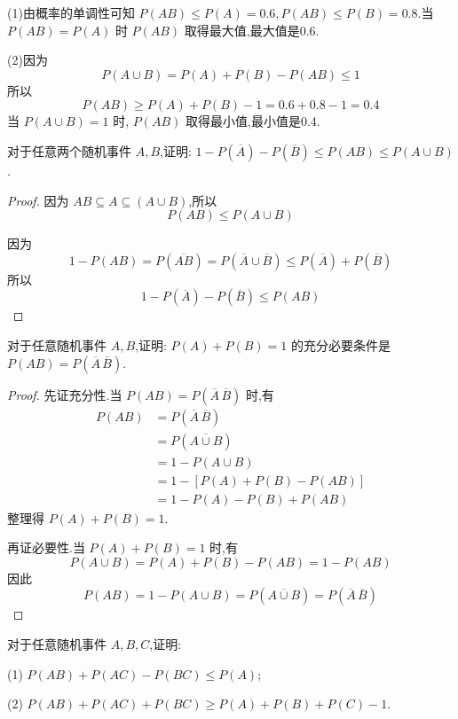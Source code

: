 \begin{solution}
    (1)由概率的单调性可知 $P(AB) \leqslant P(A) = 0.6, P(AB) \leqslant P(B) = 0.8$.当 $P(AB) = P(A)$ 时 $P(AB)$ 取得最大值,最大值是0.6.

    (2)因为
    $$
    P(A \cup B) = P(A) + P(B) - P(AB) \leqslant 1
    $$
    所以
    $$
    P(AB) \geqslant P(A) + P(B) - 1 = 0.6 + 0.8 - 1 = 0.4
    $$
    当 $P(A \cup B) = 1$ 时, $P(AB)$ 取得最小值,最小值是0.4.
\end{solution}

\question 对于任意两个随机事件 $A,B$,证明: $1 - P(\overline{A}) - P(\overline{B}) \leqslant P(AB) \leqslant P(A \cup B)$.

\begin{proof}
    因为 $AB \subseteq A \subseteq (A \cup B)$,所以
    $$
    P(AB) \leqslant P(A \cup B)
    $$

    因为
    $$
    1 - P(AB) = P(\overline{AB}) = P(\overline{A} \cup \overline{B}) \leqslant P(\overline{A}) + P(\overline{B})
    $$
    所以
    $$
    1 - P(\overline{A}) - P(\overline{B}) \leqslant P(AB)
    $$
\end{proof}

\question 对于任意随机事件 $A,B$,证明: $P(A) + P(B) = 1$ 的充分必要条件是 $P(AB) = P(\overline{A} \, \overline{B})$.

\begin{proof}
    先证充分性.当 $P(AB) = P(\overline{A} \, \overline{B})$ 时,有
    $$
    \begin{aligned}
        P(AB) &= P(\overline{A} \, \overline{B}) \\
        &= P(\overline{A \cup B}) \\
        &= 1 - P(A \cup B) \\
        &= 1 - [P(A) + P(B) - P(AB)] \\
        &= 1 - P(A) - P(B) + P(AB)
    \end{aligned}
    $$
    整理得 $P(A) + P(B) = 1$.

    再证必要性.当 $P(A) + P(B) = 1$ 时,有
    $$
    P(A \cup B) = P(A) + P(B) - P(AB) = 1 - P(AB)
    $$
    因此
    $$
    P(AB) = 1 - P(A \cup B) = P(\overline{A \cup B}) = P(\overline{A} \, \overline{B})
    $$
\end{proof}

\question 对于任意随机事件 $A,B,C$,证明:

(1) $P(AB) + P(AC) - P(BC) \leqslant P(A)$;

(2) $P(AB) + P(AC) + P(BC) \geqslant P(A) + P(B) + P(C) - 1$.

